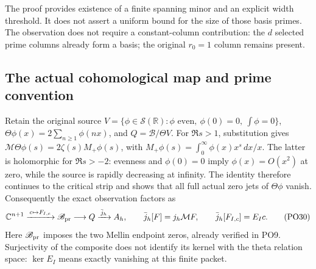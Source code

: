 \documentclass[11pt]{article}
\newcommand{\C}{\mathbb C}
\newcommand{\R}{\mathbb R}
\newcommand{\B}{\mathscr B}
\newcommand{\M}{\mathcal M}
\begin{document}
The proof provides existence of a finite spanning minor and an
explicit width threshold. It does not assert a uniform bound for
the size of those basis primes. The observation does not require
a constant-column contribution: the \(d\) selected prime columns
already form a basis; the original \(r_0=1\) column remains present.

\subsection{The actual cohomological map and prime convention}

Retain the original source
\(V=\{\phi\in\mathcal S(\R):\phi\text{ even},
\ \phi(0)=0,\ \int\phi=0\}\),
\(\Theta\phi(x)=2\sum_{n\ge1}\phi(nx)\), and \(Q=\B/\Theta V\).
For \(\Re s>1\), substitution gives
\(\M\Theta\phi(s)=2\zeta(s)M_+\phi(s)\), with
\(M_+\phi(s)=\int_0^\infty\phi(x)x^s\,dx/x\).
The latter is holomorphic for \(\Re s>-2\):
evenness and \(\phi(0)=0\) imply \(\phi(x)=O(x^2)\) at zero,
while the source is rapidly decreasing at infinity.
The identity therefore continues to the critical strip and
shows that all full actual zero jets of \(\Theta\phi\) vanish.
Consequently the exact observation factors as
\[
 \C^{n+1}\xrightarrow{\,c\mapsto F_{I,c}\,}
 \B_{\rm pr}\longrightarrow Q
       \xrightarrow{\,\bar j_h\,}A_h,\qquad
 \bar j_h[F]=j_h\M F,\qquad
 \bar j_h[F_{I,c}]=E_Ic .
 \tag{PO30}\label{po:Qmap}
\]
Here \(\B_{\rm pr}\) imposes the two Mellin endpoint zeros,
already verified in PO9. Surjectivity of the composite does
not identify its kernel with the theta relation space:
\(\ker E_I\) means exactly vanishing at this finite packet.
\end{document}
